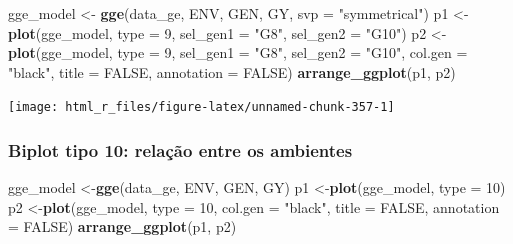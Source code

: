 \documentclass[
]{book}
\newenvironment{Shaded}{\begin{snugshade}}{\end{snugshade}}
\newcommand{\DataTypeTok}[1]{\textcolor[rgb]{0.13,0.29,0.53}{#1}}
\newcommand{\DecValTok}[1]{\textcolor[rgb]{0.00,0.00,0.81}{#1}}
\newcommand{\KeywordTok}[1]{\textcolor[rgb]{0.13,0.29,0.53}{\textbf{#1}}}
\newcommand{\NormalTok}[1]{#1}
\newcommand{\OtherTok}[1]{\textcolor[rgb]{0.56,0.35,0.01}{#1}}
\newcommand{\StringTok}[1]{\textcolor[rgb]{0.31,0.60,0.02}{#1}}
\numberwithin{equation}{section}
\newcommand{\indt}[1]{\index{#1|ST}}
\begin{document}
\begin{Shaded}
\begin{Highlighting}[]
\NormalTok{gge\_model \textless{}{-}}\StringTok{ }\KeywordTok{gge}\NormalTok{(data\_ge, ENV, GEN, GY, }\DataTypeTok{svp =} \StringTok{"symmetrical"}\NormalTok{)}
\NormalTok{p1 \textless{}{-}}\StringTok{ }\KeywordTok{plot}\NormalTok{(gge\_model, }\DataTypeTok{type =} \DecValTok{9}\NormalTok{, }\DataTypeTok{sel\_gen1 =} \StringTok{"G8"}\NormalTok{, }\DataTypeTok{sel\_gen2 =} \StringTok{"G10"}\NormalTok{)}
\NormalTok{p2 \textless{}{-}}\StringTok{ }\KeywordTok{plot}\NormalTok{(gge\_model,}
           \DataTypeTok{type =} \DecValTok{9}\NormalTok{,}
           \DataTypeTok{sel\_gen1 =} \StringTok{"G8"}\NormalTok{,}
           \DataTypeTok{sel\_gen2 =} \StringTok{"G10"}\NormalTok{,}
           \DataTypeTok{col.gen =} \StringTok{"black"}\NormalTok{,}
           \DataTypeTok{title =} \OtherTok{FALSE}\NormalTok{,}
           \DataTypeTok{annotation =} \OtherTok{FALSE}\NormalTok{)}
\KeywordTok{arrange\_ggplot}\NormalTok{(p1, p2)}
\end{Highlighting}
\end{Shaded}

\begin{center}\texttt{[image: html\_r\_files/figure-latex/unnamed-chunk-357-1]} \end{center}

\hypertarget{biplot-tipo-10-relauxe7uxe3o-entre-os-ambientes}{%
\subsubsection{Biplot tipo 10: relação entre os ambientes}\label{biplot-tipo-10-relauxe7uxe3o-entre-os-ambientes}}

\indt{biplot}

\begin{Shaded}
\begin{Highlighting}[]
\NormalTok{gge\_model \textless{}{-}}\KeywordTok{gge}\NormalTok{(data\_ge, ENV, GEN, GY)}
\NormalTok{p1 \textless{}{-}}\KeywordTok{plot}\NormalTok{(gge\_model, }\DataTypeTok{type =} \DecValTok{10}\NormalTok{)}
\NormalTok{p2 \textless{}{-}}\KeywordTok{plot}\NormalTok{(gge\_model,}
          \DataTypeTok{type =} \DecValTok{10}\NormalTok{,}
          \DataTypeTok{col.gen =} \StringTok{"black"}\NormalTok{,}
          \DataTypeTok{title =} \OtherTok{FALSE}\NormalTok{,}
          \DataTypeTok{annotation =} \OtherTok{FALSE}\NormalTok{)}
\KeywordTok{arrange\_ggplot}\NormalTok{(p1, p2)}
\end{Highlighting}
\end{Shaded}
\end{document}
